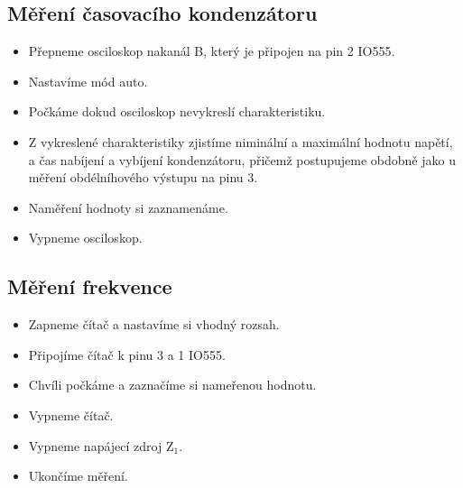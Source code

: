   \subsection{Měření časovacího kondenzátoru}
    \begin{itemize}
      \item
        Přepneme osciloskop nakanál B, který je připojen na pin 2 IO555.
      \item
        Nastavíme mód auto.
      \item
        Počkáme dokud osciloskop nevykreslí charakteristiku.
      \item
        Z vykreslené charakteristiky zjistíme niminální a maximální hodnotu napětí, a čas nabíjení a vybíjení kondenzátoru, přičemž postupujeme obdobně jako u měření obdélníhového výstupu na pinu 3.
      \item
        Naměření hodnoty si zaznamenáme.
      \item
        Vypneme osciloskop. 
    \end{itemize}
        
  \subsection{Měření frekvence}
    \begin{itemize}
      \item
        Zapneme čítač a nastavíme si vhodný rozsah.
      \item
        Připojíme čítač k pinu 3 a 1 IO555.
      \item
        Chvíli počkáme a zaznačíme si nameřenou hodnotu.
      \item
        Vypneme čítač.
      \item
        Vypneme napájecí zdroj Z$_1$.
      \item
        Ukončíme měření. 
    \end{itemize}
